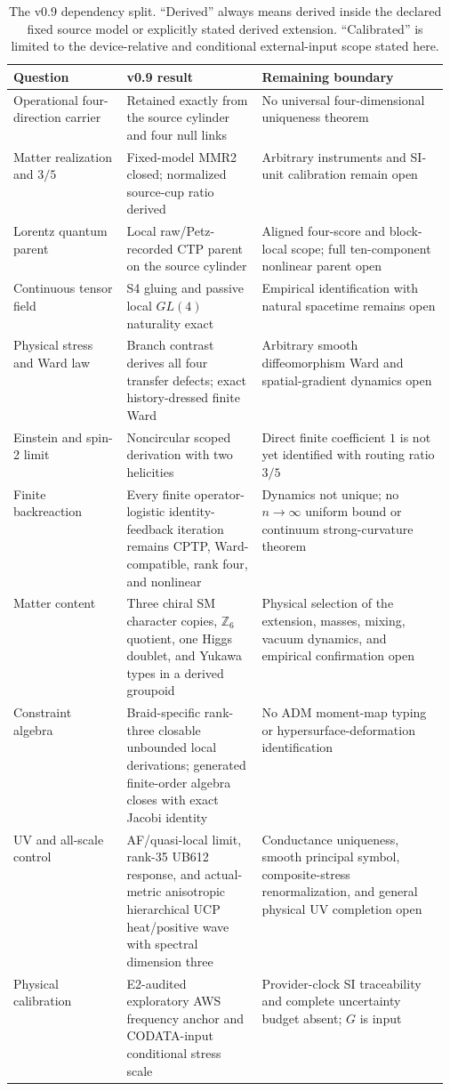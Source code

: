 \documentclass[11pt]{article}
\theoremstyle{definition}
\theoremstyle{remark}
\begin{document}
\begin{table}[ht]
\centering
\small
\begin{tabularx}{\linewidth}{>{\raggedright\arraybackslash}p{0.26\linewidth} >{\raggedright\arraybackslash}p{0.31\linewidth} X}
\toprule
Question & v0.9 result & Remaining boundary \\
\midrule
Operational four-direction carrier & Retained exactly from the source cylinder and four null links & No universal four-dimensional uniqueness theorem \\
Matter realization and $3/5$ & Fixed-model MMR2 closed; normalized source-cup ratio derived & Arbitrary instruments and SI-unit calibration remain open \\
Lorentz quantum parent & Local raw/Petz-recorded CTP parent on the source cylinder & Aligned four-score and block-local scope; full ten-component nonlinear parent open \\
Continuous tensor field & S4 gluing and passive local $GL(4)$ naturality exact & Empirical identification with natural spacetime remains open \\
Physical stress and Ward law & Branch contrast derives all four transfer defects; exact history-dressed finite Ward & Arbitrary smooth diffeomorphism Ward and spatial-gradient dynamics open \\
Einstein and spin-2 limit & Noncircular scoped derivation with two helicities & Direct finite coefficient $1$ is not yet identified with routing ratio $3/5$ \\
Finite backreaction & Every finite operator-logistic identity-feedback iteration remains CPTP, Ward-compatible, rank four, and nonlinear & Dynamics not unique; no $n\to\infty$ uniform bound or continuum strong-curvature theorem \\
Matter content & Three chiral SM character copies, $\mathbb Z_6$ quotient, one Higgs doublet, and Yukawa types in a derived groupoid & Physical selection of the extension, masses, mixing, vacuum dynamics, and empirical confirmation open \\
Constraint algebra & Braid-specific rank-three closable unbounded local derivations; generated finite-order algebra closes with exact Jacobi identity & No ADM moment-map typing or hypersurface-deformation identification \\
UV and all-scale control & AF/quasi-local limit, rank-35 UB612 response, and actual-metric anisotropic hierarchical UCP heat/positive wave with spectral dimension three & Conductance uniqueness, smooth principal symbol, composite-stress renormalization, and general physical UV completion open \\
Physical calibration & E2-audited exploratory AWS frequency anchor and CODATA-input conditional stress scale & Provider-clock SI traceability and complete uncertainty budget absent; $G$ is input \\
\bottomrule
\end{tabularx}
\caption{The v0.9 dependency split. ``Derived'' always means derived inside the declared fixed source model or explicitly stated derived extension. ``Calibrated'' is limited to the device-relative and conditional external-input scope stated here.}
\label{tab:delta}
\end{table}
\end{document}
